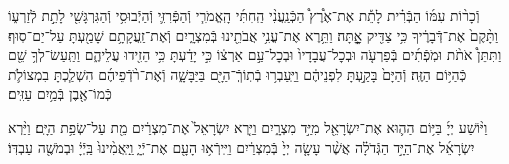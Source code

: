 \documentclass[twoside, openany, parskip=half, 11pt]{book}
\begin{document}
וְֿכָר֨וֹת עִמּ֜וֹ הַבְּֿרִ֗ית לָתֵ֡ת אֶת־אֶ֩רֶץ֩ הַכְּֿנַֽעֲנִ֨י הַֽחִתִּ֜י הָֽאֱמֹרִ֧י וְֿהַפְּֿרִזִּ֛י וְֿהַיְֿבוּסִ֥י וְֿהַגִּרְגָּשִׁ֖י לָתֵ֣ת לְֿזַרְע֑וֹ וַתָּ֨קֶם֙ אֶת־דְּֿבָרֶ֔יךָ כִּ֥י צַדִּ֖יק אׇׇׇׇָֽתָּה׃ וַתֵּ֥רֶא אֶת־עֳנִ֥י אֲבֹתֵ֖ינוּ בְּֿמִצְרָ֑יִם וְֿאֶת־זַֽעֲקָתָ֥ם שָׁמַ֖עְתָּ עַל־יַם־סֽוּף׃ וַתִּתֵּן֩ אֹתֹ֨ת וּמֹֽפְֿתִ֜ים בְּֿפַרְעֹ֤ה וּבְכׇל־עֲבָדָיו֙ וּבְכׇל־עַ֣ם אַרְצ֔וֹ כִּ֣י יָדַ֔עְתָּ כִּ֥י הֵזִ֖ידוּ עֲלֵיהֶ֑ם וַתַּֽעַשׂ־לְךָ֥ שֵׁ֖ם כְּֿהַיּ֥וֹם הַזֶּֽה׃
וְֿהַיָּם֙ בָּקַ֣עְתָּ לִפְנֵיהֶ֔ם וַיַּֽעַבְר֥וּ בְֿתֽוֹךְֿ־הַיָּ֖ם בַּיַּבָּשָׁ֑ה וְֿאֶת־רֹ֨דְֿפֵיהֶ֜ם הִשְׁלַ֧כְתָּ בִמְצוֹלֹ֛ת כְּֿמוֹ־אֶ֖בֶן בְּֿמַ֥יִם עַזִּֽים׃

וַיּ֨וֹשַׁע
יְיָ֜ בַּיּ֥וֹם הַה֛וּא אֶת־יִשְׂרָאֵ֖ל מִיַּ֣ד מִצְרָ֑יִם וַיַּ֤רְא יִשְׂרָאֵל֙ אֶת־מִצְרַ֔יִם מֵ֖ת עַל־שְׂפַ֥ת הַיָּֽם׃
וַיַּ֨רְא יִשְׂרָאֵ֜ל אֶת־הַיָּ֣ד הַגְּֿדֹלָ֗ה אֲשֶׁ֨ר עָשָׂ֤ה יְיָ֙ בְּֿמִצְרַ֔יִם וַיִּֽירְֿא֥וּ הָעָ֖ם אֶת־יְֿיָ֑ וַֽיַּֽאֲמִ֨ינוּ֙ בַּֽיְֿיָ֔ וּבְמֹשֶׁ֖ה עַבְדּֽוֹ׃
\end{document}
